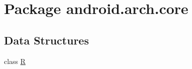 \hypertarget{namespaceandroid_1_1arch_1_1core}{}\section{Package android.\+arch.\+core}
\label{namespaceandroid_1_1arch_1_1core}
\subsection*{Data Structures}
\begin{DoxyCompactItemize}
\item 
class \mbox{\hyperlink{classandroid_1_1arch_1_1core_1_1_r}{R}}
\end{DoxyCompactItemize}
